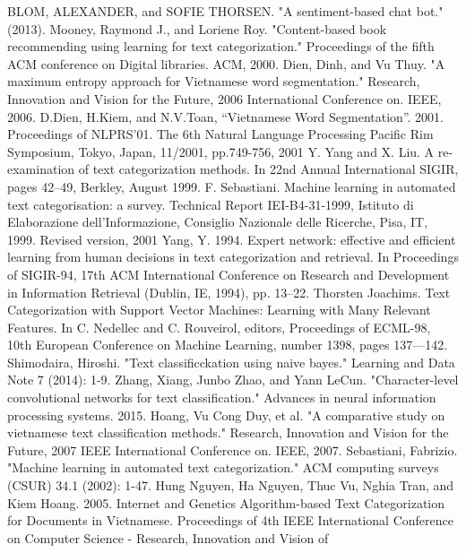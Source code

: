 \documentclass[conference]{IEEEtran}
\begin{document}
\begin{thebibliography}{1}

BLOM, ALEXANDER, and SOFIE THORSEN. "A sentiment-based chat bot." (2013).
Mooney, Raymond J., and Loriene Roy. "Content-based book recommending using learning for text categorization." Proceedings of the fifth ACM conference on Digital libraries. ACM, 2000.
Dien, Dinh, and Vu Thuy. "A maximum entropy approach for Vietnamese
word segmentation." Research, Innovation and Vision for the Future,
2006 International Conference on. IEEE, 2006.
 D.Dien, H.Kiem, and N.V.Toan, “Vietnamese Word Segmentation”.
2001. Proceedings of NLPRS’01. The 6th Natural Language Processing
Pacific Rim Symposium, Tokyo, Japan, 11/2001, pp.749-756, 2001
Y. Yang and X. Liu. A re-examination of text categorization methods. In 22nd
Annual International SIGIR, pages 42–49, Berkley, August 1999.
F. Sebastiani. Machine learning in automated text categorisation: a survey. Technical
Report IEI-B4-31-1999, Istituto di Elaborazione dell’Informazione, Consiglio
Nazionale delle Ricerche, Pisa, IT, 1999. Revised version, 2001
Yang, Y. 1994. Expert network: effective and efficient learning from
human decisions in text categorization and retrieval. In Proceedings of
SIGIR-94, 17th ACM International Conference on Research and
Development in Information Retrieval (Dublin, IE, 1994), pp. 13–22.
Thorsten Joachims. Text Categorization with Support Vector Machines:
Learning with Many Relevant Features. In C. Nedellec and C.
Rouveirol, editors, Proceedings of ECML-98, 10th European
Conference on Machine Learning, number 1398, pages 137—142.
Shimodaira, Hiroshi. "Text classificckation using naive bayes." Learning and Data Note 7 (2014): 1-9.
Zhang, Xiang, Junbo Zhao, and Yann LeCun. "Character-level convolutional networks for text classification." Advances in neural information processing systems. 2015.
Hoang, Vu Cong Duy, et al. "A comparative study on vietnamese text classification methods." Research, Innovation and Vision for the Future, 2007 IEEE International Conference on. IEEE, 2007.
Sebastiani, Fabrizio. "Machine learning in automated text categorization." ACM computing surveys (CSUR) 34.1 (2002): 1-47.
Hung Nguyen, Ha Nguyen, Thuc Vu, Nghia Tran, and Kiem Hoang.
2005. Internet and Genetics Algorithm-based Text Categorization for
Documents in Vietnamese. Proceedings of 4th IEEE International
Conference on Computer Science - Research, Innovation and Vision of

\end{thebibliography}
\end{document}
